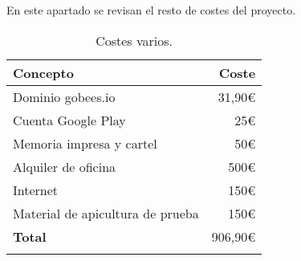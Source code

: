 En este apartado se revisan el resto de costes del proyecto.

\begin{longtable}[]{@{}lr@{}}
\toprule
\begin{minipage}[b]{0.48\columnwidth}\raggedright\strut
\textbf{Concepto}\strut
\end{minipage} & \begin{minipage}[b]{0.18\columnwidth}\raggedright\strut
\textbf{Coste}\strut
\end{minipage}\tabularnewline
\midrule
\endhead
\begin{minipage}[t]{0.48\columnwidth}\raggedright\strut
Dominio gobees.io\strut
\end{minipage} & \begin{minipage}[t]{0.18\columnwidth}\raggedright\strut
31,90\euro{}\strut
\end{minipage}\tabularnewline
\begin{minipage}[t]{0.48\columnwidth}\raggedright\strut
Cuenta Google Play\strut
\end{minipage} & \begin{minipage}[t]{0.18\columnwidth}\raggedright\strut
25\euro{}\strut
\end{minipage}\tabularnewline
\begin{minipage}[t]{0.48\columnwidth}\raggedright\strut
Memoria impresa y cartel\strut
\end{minipage} & \begin{minipage}[t]{0.18\columnwidth}\raggedright\strut
50\euro{}\strut
\end{minipage}\tabularnewline
\begin{minipage}[t]{0.48\columnwidth}\raggedright\strut
Alquiler de oficina\strut
\end{minipage} & \begin{minipage}[t]{0.18\columnwidth}\raggedright\strut
500\euro{}\strut
\end{minipage}\tabularnewline
\begin{minipage}[t]{0.48\columnwidth}\raggedright\strut
Internet\strut
\end{minipage} & \begin{minipage}[t]{0.18\columnwidth}\raggedright\strut
150\euro{}\strut
\end{minipage}\tabularnewline
\begin{minipage}[t]{0.48\columnwidth}\raggedright\strut
Material de apicultura de prueba\strut
\end{minipage} & \begin{minipage}[t]{0.18\columnwidth}\raggedright\strut
150\euro{}\strut
\end{minipage}\tabularnewline
\midrule
\begin{minipage}[t]{0.48\columnwidth}\raggedright\strut
\textbf{Total}\strut
\end{minipage} & \begin{minipage}[t]{0.18\columnwidth}\raggedright\strut
906,90\euro{}\strut
\end{minipage}\tabularnewline
\bottomrule
\caption{Costes varios.}
\end{longtable}

